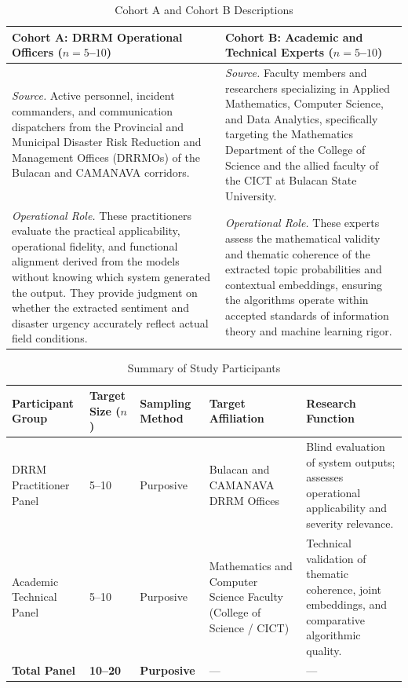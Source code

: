 \documentclass[12pt,a4paper]{report}
\begin{document}
\begin{table}[htbp]
  \centering
  \caption{Cohort A and Cohort B Descriptions}
  \label{tab:cohorts}
  \begin{tabularx}{\textwidth}{XX}
    \toprule
    \textbf{Cohort A: DRRM Operational Officers ($n = 5$--$10$)} &
    \textbf{Cohort B: Academic and Technical Experts ($n = 5$--$10$)} \\
    \midrule
    \textit{Source.} Active personnel, incident commanders, and communication
    dispatchers from the Provincial and Municipal Disaster Risk Reduction and
    Management Offices (DRRMOs) of the Bulacan and CAMANAVA corridors. &
    \textit{Source.} Faculty members and researchers specializing in Applied
    Mathematics, Computer Science, and Data Analytics, specifically targeting
    the Mathematics Department of the College of Science and the allied faculty
    of the CICT at Bulacan State University. \\
    \addlinespace
    \textit{Operational Role.} These practitioners evaluate the practical
    applicability, operational fidelity, and functional alignment derived from
    the models without knowing which system generated the output. They provide
    judgment on whether the extracted sentiment and disaster urgency accurately
    reflect actual field conditions. &
    \textit{Operational Role.} These experts assess the mathematical validity
    and thematic coherence of the extracted topic probabilities and contextual
    embeddings, ensuring the algorithms operate within accepted standards of
    information theory and machine learning rigor. \\
    \bottomrule
  \end{tabularx}
\end{table}

\begin{table}[htbp]
  \centering
  \caption{Summary of Study Participants}
  \label{tab:participants}
  \begin{tabularx}{\textwidth}{XXXXX}
    \toprule
    \textbf{Participant Group} & \textbf{Target Size ($n$)} &
    \textbf{Sampling Method} & \textbf{Target Affiliation} &
    \textbf{Research Function} \\
    \midrule
    DRRM Practitioner Panel & 5--10 & Purposive &
    Bulacan and CAMANAVA DRRM Offices &
    Blind evaluation of system outputs; assesses operational applicability and
    severity relevance. \\
    \addlinespace
    Academic Technical Panel & 5--10 & Purposive &
    Mathematics and Computer Science Faculty (College of Science / CICT) &
    Technical validation of thematic coherence, joint embeddings, and
    comparative algorithmic quality. \\
    \addlinespace
    \textbf{Total Panel} & \textbf{10--20} & \textbf{Purposive} & --- & --- \\
    \bottomrule
  \end{tabularx}
\end{table}
\end{document}
